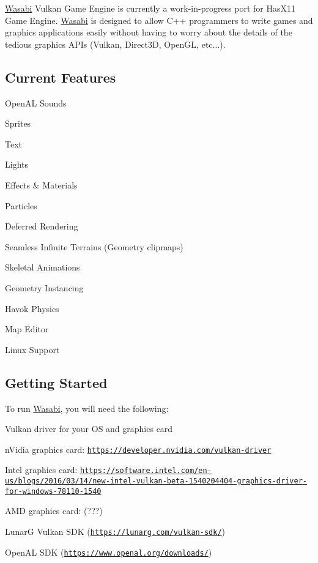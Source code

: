 \hyperlink{class_wasabi}{Wasabi} Vulkan Game Engine is currently a work-\/in-\/progress port for Has\+X11 Game Engine. \hyperlink{class_wasabi}{Wasabi} is designed to allow C++ programmers to write games and graphics applications easily without having to worry about the details of the tedious graphics A\+P\+Is (Vulkan, Direct3D, Open\+GL, etc...).

\subsection*{Current Features}

 Open\+AL Sounds

 Sprites

 Text

 Lights

 Effects \& Materials

 Particles

 Deferred Rendering

 Seamless Infinite Terrains (Geometry clipmaps)

 Skeletal Animations

 Geometry Instancing

 Havok Physics

 Map Editor

 Linux Support

\subsection*{Getting Started}

To run \hyperlink{class_wasabi}{Wasabi}, you will need the following\+:


\begin{DoxyItemize}
\item Vulkan driver for your OS and graphics card
\begin{DoxyItemize}
\item n\+Vidia graphics card\+: \href{https://developer.nvidia.com/vulkan-driver}{\tt https\+://developer.\+nvidia.\+com/vulkan-\/driver}
\item Intel graphics card\+: \href{https://software.intel.com/en-us/blogs/2016/03/14/new-intel-vulkan-beta-1540204404-graphics-driver-for-windows-78110-1540}{\tt https\+://software.\+intel.\+com/en-\/us/blogs/2016/03/14/new-\/intel-\/vulkan-\/beta-\/1540204404-\/graphics-\/driver-\/for-\/windows-\/78110-\/1540}
\item A\+MD graphics card\+: (???)
\end{DoxyItemize}
\item LunarG Vulkan S\+DK (\href{https://lunarg.com/vulkan-sdk/}{\tt https\+://lunarg.\+com/vulkan-\/sdk/})
\item Open\+AL S\+DK (\href{https://www.openal.org/downloads/}{\tt https\+://www.\+openal.\+org/downloads/})
\end{DoxyItemize}

